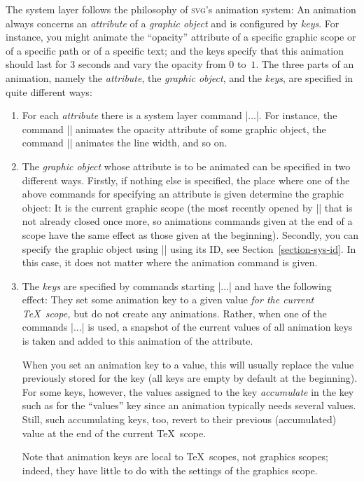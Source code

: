 The system layer follows the philosophy of \textsc{svg}'s animation
system: An animation always concerns an \emph{attribute} of a
\emph{graphic object} and is configured by \emph{keys}. For instance,
you might animate the ``opacity'' attribute of a specific graphic
scope or of a specific path or of a specific text; and the keys
specify that this animation should last for 3 seconds and vary the
opacity from $0$ to~$1$. The three parts of an animation, namely the
\emph{attribute}, the \emph{graphic object}, and the \emph{keys}, are
specified in quite different ways:

\begin{enumerate}
\item For each \emph{attribute} there is a system layer command
  |\pgfsys@animate...|. For instance, the command |\pgfsys@animateopacity|
  animates the opacity attribute of some graphic object, the command
  |\pgfsys@animatelinewidth| animates the line width, and so on.
\item The \emph{graphic object} whose attribute is to be animated can
  be specified in two different ways. Firstly, if nothing else is
  specified, the place where one of the above commands for specifying
  an attribute is given determine the graphic object: It is the
  current graphic scope (the most recently opened by
  |\pgfsys@beginscope| that is not already closed once more, so
  animations commands given at the end of a scope have the same effect
  as those given at the beginning). Secondly, you can specify the
  graphic object using |\pgfsys@animation@whom| using its ID, see
  Section~\ref{section-sys-id}. In this case, it does not matter where
  the animation command is given. 
\item The \emph{keys} are specified by commands starting
  |\pgfsys@animation@...| and have the following effect: They set some
  animation key to a given value \emph{for the current \TeX\ scope,}
  but do not create any animations. Rather, when one of the commands
  |\pgfsys@animate...| is used, a snapshot of the current values of
  all animation keys is taken and added to this animation of the
  attribute.

  When you set an animation key to a value, this will usually replace
  the value previously stored for the key (all keys are empty by
  default at the beginning). For some keys, however, the values
  assigned to the key \emph{accumulate} in the key such as for the
  ``values'' key since an animation typically needs several
  values. Still, such accumulating keys, too, revert to their previous
  (accumulated) value at the end of the current \TeX\ scope. 

  Note that animation keys are local to \TeX\ scopes, not graphics
  scopes; indeed, they have little to do with the settings of the
  graphics scope. 
\end{enumerate}

